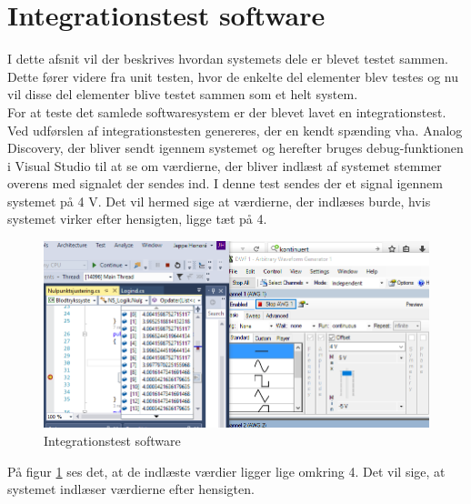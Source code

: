 \section{Integrationstest software}
I dette afsnit vil der beskrives hvordan systemets dele er blevet testet sammen. Dette fører videre fra unit testen, hvor de enkelte del elementer blev testes og nu vil disse del elementer blive testet sammen som et helt system. \\
For at teste det samlede softwaresystem er der blevet lavet en integrationstest. Ved udførslen af integrationstesten genereres, der en kendt spænding vha. Analog Discovery, der bliver sendt igennem systemet og herefter bruges debug-funktionen i Visual Studio til at se om værdierne, der bliver indlæst af systemet stemmer overens med signalet der sendes ind.
I denne test sendes der et signal igennem systemet på 4 V. Det vil hermed sige at værdierne, der indlæses burde, hvis systemet virker efter hensigten, ligge tæt på 4.
\begin{figure}[H]
	\centering
	\includegraphics[width=1\textwidth]{Figurer/Softwareimplementering/Integrationstest}
	\caption{Integrationstest software}
	\label{fig:integrationstestsoftware}
\end{figure}
På figur \ref{fig:integrationstestsoftware} ses det, at de indlæste værdier ligger lige omkring 4. Det vil sige, at systemet indlæser værdierne efter hensigten.   

